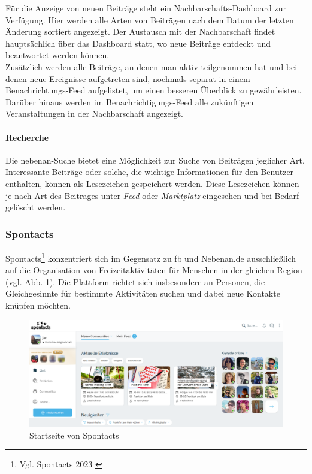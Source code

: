 Für die Anzeige von neuen Beiträge steht ein Nachbarschafts-Dashboard zur Verfügung. Hier werden alle Arten von Beiträgen nach dem Datum der letzten Änderung sortiert angezeigt. Der Austausch mit der Nachbarschaft findet hauptsächlich über das Dashboard statt, wo neue Beiträge entdeckt und beantwortet werden können. \\
Zusätzlich werden alle Beiträge, an denen man aktiv teilgenommen hat und bei denen neue Ereignisse aufgetreten sind, nochmals separat in einem Benachrichtungs-Feed aufgelistet, um einen besseren Überblick zu gewährleisten. Darüber hinaus werden im Benachrichtigungs-Feed alle zukünftigen Veranstaltungen in der Nachbarschaft angezeigt.

\paragraph{Recherche}

Die nebenan-Suche bietet eine Möglichkeit zur Suche von Beiträgen jeglicher Art. Interessante Beiträge oder solche, die wichtige Informationen für den Benutzer enthalten, können als Lesezeichen gespeichert werden. Diese Lesezeichen können je nach Art des Beitrages unter \textit{Feed} oder \textit{Marktplatz} eingesehen und bei Bedarf gelöscht werden.

\subsubsection{Spontacts}

Spontacts\footnote{Vgl. Spontacts 2023 \cite{spontacts}} konzentriert sich im Gegensatz zu \acrshort{fb} und Nebenan.de ausschließlich auf die Organisation von Freizeitaktivitäten für Menschen in der gleichen Region (vgl. Abb. \ref{fig:spontacts}). Die Plattform richtet sich insbesondere an Personen, die Gleichgesinnte für bestimmte Aktivitäten suchen und dabei neue Kontakte knüpfen möchten.

\begin{figure}[!htb]
    \centering
    \includegraphics[width=\textwidth]{figures/jan/pic_spontacts.png}
    \caption[Startseite von Spontacts]{Startseite von Spontacts}
    \label{fig:spontacts}
\end{figure}

